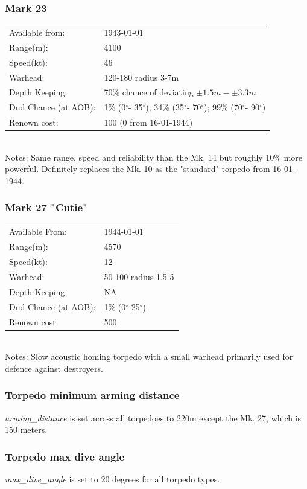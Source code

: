 \documentclass{article}
\newcommand{\degree}{$^{\circ}$}
\begin{document}
\subsubsection{Mark 23}
\begin{tabular}{l|l}
Available from:& 1943-01-01\\
Range(m):& 4100\\
Speed(kt):&46\\
Warhead:& 120-180 radius 3-7m\\
Depth Keeping:& 70\% chance of deviating $\pm 1.5m - \pm 3.3m$\\
Dud Chance (at AOB):& 1\% (0\degree - 35\degree); 34\% (35\degree- 70\degree); 99\% (70\degree- 90\degree)\\
Renown cost:&  100 (0 from 16-01-1944)\\
\end{tabular} \\
Notes: Same range, speed and reliability than the Mk. 14 but roughly 10\% more powerful. Definitely replaces the Mk. 10 as the "standard" torpedo from 16-01-1944.

\subsubsection{Mark 27 "Cutie"}
\begin{tabular}{l|l}
Available From:& 1944-01-01\\
Range(m):& 4570\\
Speed(kt):&12\\
Warhead:& 50-100 radius 1.5-5\\
Depth Keeping:& NA\\
Dud Chance (at AOB):& 1\% (0\degree-25\degree)\\
Renown cost:& 500\\
\end{tabular} \\
Notes: Slow acoustic homing torpedo with a small warhead primarily used for defence against destroyers.

\subsubsection{Torpedo minimum arming distance}
\emph{arming\_distance} is set across all torpedoes to 220m except the Mk. 27, which is 150 meters.
\subsubsection{Torpedo max dive angle}
\emph{max\_dive\_angle} is set to 20 degrees for all torpedo types.
\end{document}
